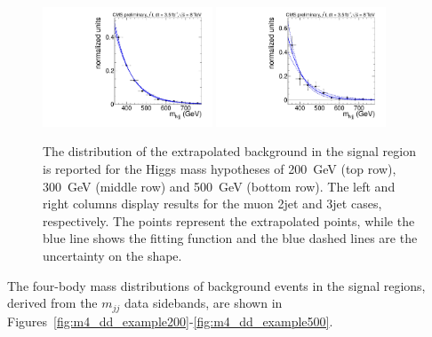 \begin{figure}[!t]
    \includegraphics[width=0.45\textwidth]{plots/2012_WJetsShape/H500_Mlvjj_Muon_2jets_WpJShape.pdf}
    \includegraphics[width=0.45\textwidth]{plots/2012_WJetsShape/H500_Mlvjj_Muon_3jets_WpJShape.pdf}
  \caption{\label{fig:Wjets_dd_example} The distribution of the
       extrapolated background in the signal region is reported for
       the Higgs mass hypotheses of 200~GeV (top row), 300~GeV (middle
       row) and 500~GeV (bottom row). The left and right columns
       display results for the muon 2jet and 3jet cases, respectively.
       The points represent the extrapolated points, while the blue
       line shows the fitting function and the blue dashed lines are
       the uncertainty on the shape.  }
\end{figure}

The four-body mass distributions of background events in the signal regions,
derived from the $m_{jj}$ data sidebands, are shown in Figures~\ref{fig:m4_dd_example200}-\ref{fig:m4_dd_example500}.

